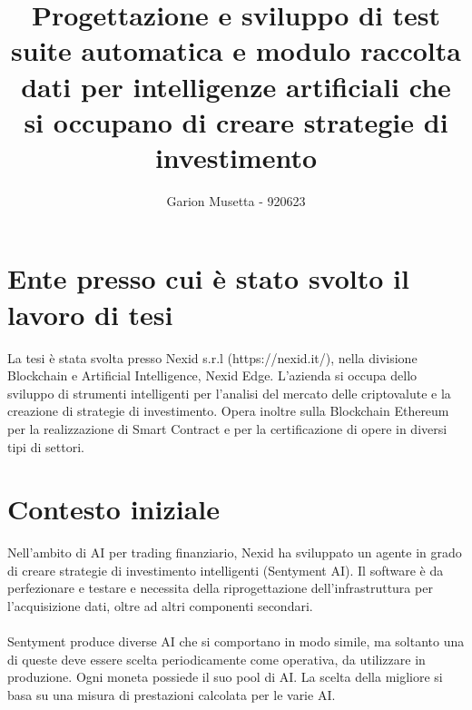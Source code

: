 \documentclass{article}
\title{\textbf{Progettazione e sviluppo di test suite automatica e modulo raccolta dati per intelligenze artificiali che si occupano di creare strategie di investimento}}
\author{Garion Musetta - 920623}
\begin{document}
\maketitle

\section{Ente presso cui è stato svolto il lavoro di tesi}
La tesi è stata svolta presso Nexid s.r.l (https://nexid.it/), nella divisione Blockchain e Artificial Intelligence, Nexid Edge. L'azienda si occupa dello sviluppo di strumenti intelligenti per l'analisi del mercato delle criptovalute e la creazione di strategie di investimento. Opera inoltre sulla Blockchain Ethereum per la realizzazione di Smart Contract e per la certificazione di opere in diversi tipi di settori.

\section{Contesto iniziale}
Nell'ambito di AI per trading finanziario, Nexid ha sviluppato un agente in grado di creare strategie di investimento intelligenti (Sentyment AI). Il software è da perfezionare e testare e necessita della riprogettazione dell'infrastruttura per l'acquisizione dati, oltre ad altri componenti secondari.\\~\\ Sentyment produce diverse AI che si comportano in modo simile, ma soltanto una di queste deve essere scelta periodicamente come operativa, da utilizzare in produzione. Ogni moneta possiede il suo pool di AI. La scelta della migliore si basa su una misura di prestazioni calcolata per le varie AI.
\end{document}
